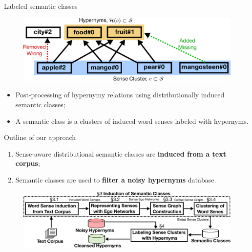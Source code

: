\documentclass[usenames,dvipsnames,notes]{beamer}
\begin{document}
\begin{frame}{ Labeled semantic classes}

\begin{figure}[ht]
  \centering
  \includegraphics[width=.99\textwidth]{figures/coset}

\end{figure}

\begin{itemize}
\item \alert{Post-processing of hypernymy relations} using distributionally induced semantic classes;
\item A semantic class is a clusters of induced word senses \alert{labeled with hypernyms}.

\end{itemize}



\end{frame}


\begin{frame}{Outline of our approach}



\begin{enumerate}
	\item Sense-aware distributional semantic classes are \textbf{induced from a text corpus}; 
	\item Semantic classes are used to \textbf{filter a noisy hypernyms} database. 
 
\end{enumerate}

\pause 


\begin{figure}
  \centering
  \includegraphics[width=.99\textwidth]{figures/outline}
  \end{figure}



\end{frame}
\end{document}

